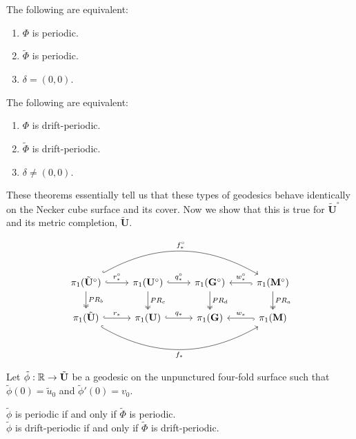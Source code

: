 \documentclass[]{article}
\def\bU{\mathbf{U}} \def\btU{\tilde{\bU}} \def\bUs{\bU^\circ}
\def\bG{\mathbf{G}} \def\bGs{\mathbf{G}^\circ}
\def\bM{\mathbf{M}}
\def\bMs{\mathbf{M}^\circ}
\def\btUs{\btU^\circ}
\def\utild{\tilde{u}_0}
\def\phitild{\tilde{\Phi}}
\def\tildphi{\tilde{\phi}}
\begin{document}
\begin{cor}
The following are equivalent:
\begin{enumerate}
\item $\Phi$ is periodic.
\item $\phitild$ is periodic.
\item $\delta=(0,0)$.
\end{enumerate}
\end{cor}

\begin{cor}
The following are equivalent:
\begin{enumerate}
\item $\Phi$ is drift-periodic.
\item $\phitild$ is drift-periodic.
\item $\delta\neq(0,0)$.
\end{enumerate}
\end{cor}

These theorems essentially tell us that these types of geodesics behave identically on the Necker cube surface and its cover. Now we show that this is true for $\btUs$ and its metric completion, $\btU$.

\begin{equation}
\begin{tikzcd}
\arrow[hookrightarrow, bend left]{rrr}{f_*^\circ}[swap]{} \arrow[two heads]{d}{PR_b} \pi_1(\btUs) \arrow[hook]{r}{r_*^\circ} & \pi_1(\bUs) \arrow[two heads]{d}{PR_c} \arrow[hook]{r}{q_*^\circ} & \pi_1(\bGs) \arrow[two heads]{d}{PR_d} & \ar[hookrightarrow]{l}{}[swap]{w_*^\circ} \pi_1(\bMs) \arrow[two heads]{d}{PR_a} \\
\arrow[hookrightarrow, bend right]{rrr}{}[swap]{f_*}  \pi_1(\btU) \arrow[hook]{r}{r_*} & \pi_1(\bU) \arrow[hook]{r}{q_*} & \pi_1(\bG) & \ar[hookrightarrow]{l}{}[swap]{w_*} \pi_1(\bM)\\
\end{tikzcd}
\label{eq:homomorphism}
\end{equation}



\begin{Def}
Let $\tildphi:\RR\rightarrow\btU$ be a geodesic on the unpunctured four-fold surface such that $\tildphi(0)=\utild$ and $\tildphi'(0)=v_0$.
\end{Def}

\begin{thm}
$\tildphi$ is periodic if and only if $\phitild$ is periodic.\\
$\tildphi$ is drift-periodic if and only if $\phitild$ is drift-periodic.
\end{thm}
\end{document}
